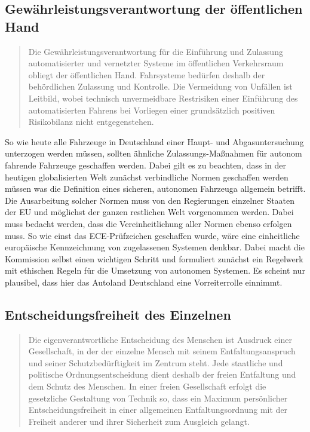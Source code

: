 \documentclass[twoside,a4paper,12pt]{article}
\begin{document}
\subsection{Gewährleistungsverantwortung der öffentlichen Hand} \label{GewaehrleistungsverantwortungDerOeffentlichenHand}

\begin{quote}
\glqq
Die Gewährleistungsverantwortung für die Einführung und Zulassung automatisierter
und vernetzter Systeme im öffentlichen Verkehrsraum obliegt der öffentlichen Hand.
Fahrsysteme bedürfen deshalb der behördlichen Zulassung und Kontrolle. Die Vermeidung von Unfällen ist Leitbild, wobei technisch 
unvermeidbare Restrisiken einer Einführung des automatisierten Fahrens bei Vorliegen einer grundsätzlich positiven Risikobilanz
nicht entgegenstehen.\grqq\mbox{~\cite[S. 10]{ek}}
\end{quote}

So wie heute alle Fahrzeuge in Deutschland einer Haupt- und Abgasuntersuchung unterzogen werden müssen, sollten ähnliche Zulassungs-Maßnahmen für autonom
fahrende Fahrzeuge geschaffen werden. Dabei gilt es zu beachten, dass in der heutigen globalisierten Welt zunächst verbindliche Normen geschaffen werden müssen was  die Definition eines sicheren, autonomen Fahrzeuga allgemein betrifft. Die Ausarbeitung solcher Normen muss von den Regierungen einzelner Staaten der EU und möglichst der ganzen restlichen Welt vorgenommen werden. Dabei muss bedacht werden, dass die Vereinheitlichung aller Normen ebenso erfolgen muss. So wie einst das
ECE-Prüfzeichen geschaffen wurde, wäre eine einheitliche europäische Kennzeichnung von zugelassenen Systemen denkbar. Dabei macht die Kommission selbst einen wichtigen Schritt und formuliert zunächst ein Regelwerk mit ethischen Regeln für die Umsetzung von autonomen Systemen. Es scheint nur plausibel, dass hier das Autoland Deutschland eine Vorreiterrolle einnimmt.\\

\subsection{Entscheidungsfreiheit des Einzelnen} \label{EntscheidungsfreiheitDesEinzelnen}

\begin{quote}
\glqq
Die eigenverantwortliche Entscheidung des Menschen ist Ausdruck einer Gesellschaft, in
der der einzelne Mensch mit seinem Entfaltungsanspruch und seiner Schutzbedürftigkeit
im Zentrum steht. Jede staatliche und politische Ordnungsentscheidung dient deshalb
der freien Entfaltung und dem Schutz des Menschen. In einer freien Gesellschaft erfolgt
die gesetzliche Gestaltung von Technik so, dass ein Maximum persönlicher Entscheidungsfreiheit in einer allgemeinen 
Entfaltungsordnung mit der Freiheit anderer und ihrer
Sicherheit zum Ausgleich gelangt.\grqq\mbox{~\cite[S. 10]{ek}}
\end{quote}
\end{document}
